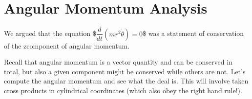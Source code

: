 \documentclass[letterpaper,10pt,english]{jupyterBook}
\begin{document}
\section{Angular Momentum Analysis}
\label{\detokenize{content/1_mechanics/lagrange_2:angular-momentum-analysis}}
\sphinxAtStartPar
We argued that the equation
\$\(\dfrac{d}{dt}\left(mr^2\dot{\theta}\right) = 0\)\$
was a statement of conservation of the z\sphinxhyphen{}component of angular momentum.

\sphinxAtStartPar
Recall that angular momentum is a vector quantity and can be conserved in total, but also a given component might be conserved while others are not. Let’s compute the angular momentum and see what the deal is. This will involve taken cross products in cylindrical coordinates (which also obey the right hand rule!).
\end{document}

